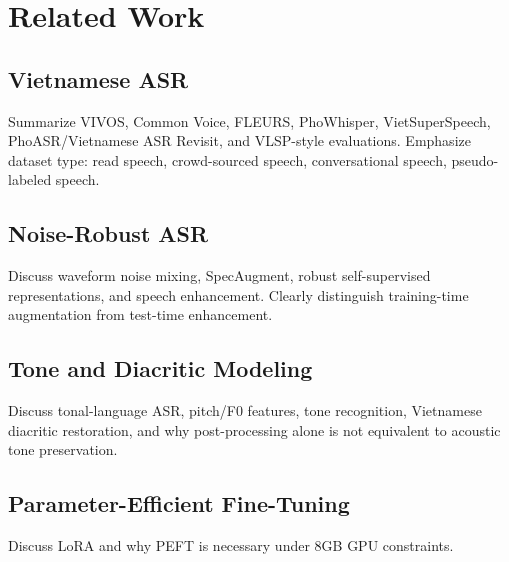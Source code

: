 \section{Related Work}
\subsection{Vietnamese ASR}
Summarize VIVOS, Common Voice, FLEURS, PhoWhisper, VietSuperSpeech, PhoASR/Vietnamese ASR Revisit, and VLSP-style evaluations. Emphasize dataset type: read speech, crowd-sourced speech, conversational speech, pseudo-labeled speech.

\subsection{Noise-Robust ASR}
Discuss waveform noise mixing, SpecAugment, robust self-supervised representations, and speech enhancement. Clearly distinguish training-time augmentation from test-time enhancement.

\subsection{Tone and Diacritic Modeling}
Discuss tonal-language ASR, pitch/F0 features, tone recognition, Vietnamese diacritic restoration, and why post-processing alone is not equivalent to acoustic tone preservation.

\subsection{Parameter-Efficient Fine-Tuning}
Discuss LoRA and why PEFT is necessary under 8GB GPU constraints.
